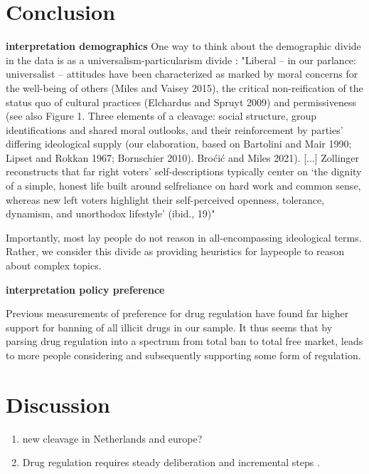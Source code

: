 \documentclass[11pt,a4paper]{article}
\begin{document}
\section{Conclusion}

\textbf{interpretation demographics} One way to think about the demographic divide in the data is as a universalism-particularism divide \parencite{damhuis2024cleavage}: "Liberal – in our parlance: universalist – attitudes have been characterized as marked by moral concerns for the well-being of others (Miles and Vaisey 2015), the critical non-reification of the status quo of cultural practices (Elchardus and Spruyt 2009) and permissiveness (see also  Figure 1. Three elements of a cleavage: social structure, group identifications and shared moral outlooks, and their reinforcement by parties’ differing ideological supply (our elaboration, based on Bartolini and Mair 1990; Lipset and Rokkan 1967; Bornschier 2010). Broćić and Miles 2021). [...] Zollinger reconstructs that far right voters’ self-descriptions typically center on ‘the dignity of a simple, honest life built around selfreliance on hard work and common sense, whereas new left voters highlight their self-perceived openness, tolerance, dynamism, and unorthodox lifestyle’ (ibid., 19)" 

Importantly, most lay people do not reason in all-encompassing ideological terms. Rather, we consider this divide as providing heuristics for laypeople to reason about complex topics. 


\textbf{interpretation policy preference}

Previous measurements of preference for drug regulation have found far higher support for banning of all illicit drugs in our sample. It thus seems that by parsing drug regulation into a spectrum from total ban to total free market, leads to more people considering and subsequently supporting some form of regulation. 






\section{Discussion}




\begin{enumerate}
    \item new cleavage in Netherlands and europe?
    \item Drug regulation requires steady deliberation and incremental steps \parencite{maccoun2001}.
\end{enumerate}
\end{document}

